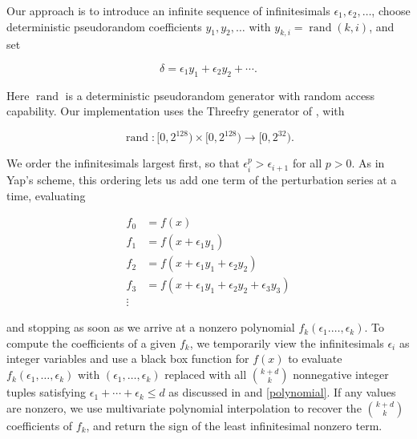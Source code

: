 \documentclass[11pt]{article}
\newcommand{\rand}{\operatorname{rand}}
\begin{document}
Our approach is to introduce an infinite sequence of infinitesimals $\epsilon_1, \epsilon_2, \ldots$, choose deterministic pseudorandom coefficients $y_1, y_2, \ldots$
with $y_{k,i} = \rand(k,i)$, and set
\begin{linenomath*}
$$\delta = \epsilon_1 y_1 + \epsilon_2 y_2 + \cdots.$$
\end{linenomath*}
Here $\rand$ is a deterministic pseudorandom generator with random access capability.  Our implementation uses the Threefry generator of
\cite{salmon2011random}, with
\begin{linenomath*}
$$\rand : [0,2^{128}) \times [0,2^{128}) \to [0,2^{32}).$$
\end{linenomath*}
We order the infinitesimals largest first, so that $\epsilon_i^p > \epsilon_{i+1}$ for all $p > 0$.  As in Yap's scheme, this ordering lets us add one term of the
perturbation series at a time, evaluating
\begin{linenomath*}
\begin{align*}
f_0 &= f(x) \\
f_1 &= f(x + \epsilon_1 y_1) \\
f_2 &= f(x + \epsilon_1 y_1 + \epsilon_2 y_2) \\
f_3 &= f(x + \epsilon_1 y_1 + \epsilon_2 y_2 + \epsilon_3 y_3) \\
\vdots
\end{align*}
\end{linenomath*}
and stopping as soon as we arrive at a nonzero polynomial $f_k(\epsilon_1. \ldots, \epsilon_k)$.
To compute the coefficients of a given $f_k$, we temporarily view the infinitesimals $\epsilon_i$ as integer variables and use a black box function for $f(x)$ to evaluate
$f_k(\epsilon_1, \ldots, \epsilon_k)$ with $(\epsilon_1, \ldots, \epsilon_k)$ replaced with all $\binom{k+d}{k}$ nonnegative integer tuples satisfying $\epsilon_1 + \cdots + \epsilon_k \le d$
as discussed in \cite{neidinger2009multivariable} and \autoref{polynomial}.
If any values are nonzero, we use multivariate polynomial interpolation to recover the $\binom{k+d}{k}$ coefficients of $f_k$, and return the sign of the least infinitesimal nonzero term.
\end{document}
